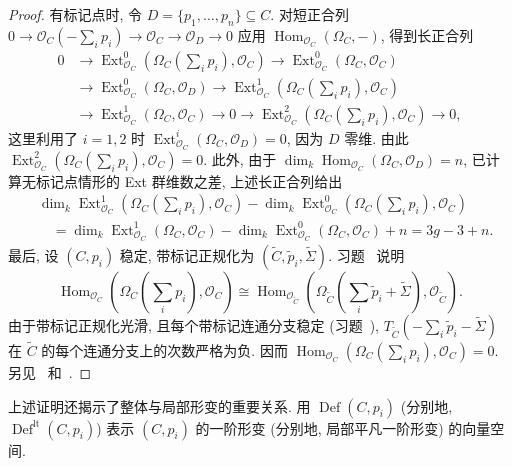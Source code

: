 \begin{proof}
有标记点时, 令 $D=\{p_1,\allowbreak \ldots,\allowbreak p_n\}\subseteq C$. 对短正合列 $0\to\mathcal O_C(-\sum_i p_i)\to\mathcal O_C\to\mathcal O_D\to0$ 应用 $\operatorname{Hom}_{\mathcal O_C}(\Omega_C,\allowbreak -)$, 得到长正合列
\[
\begin{aligned}
0&\to\operatorname{Ext}^0_{\mathcal O_C}(\Omega_C(\sum_i p_i),\mathcal O_C)\to\operatorname{Ext}^0_{\mathcal O_C}(\Omega_C,\mathcal O_C)\\
&\to\operatorname{Ext}^0_{\mathcal O_C}(\Omega_C,\mathcal O_D)\to\operatorname{Ext}^1_{\mathcal O_C}(\Omega_C(\sum_i p_i),\mathcal O_C)\\
&\to\operatorname{Ext}^1_{\mathcal O_C}(\Omega_C,\mathcal O_C)\to0\to\operatorname{Ext}^2_{\mathcal O_C}(\Omega_C(\sum_i p_i),\mathcal O_C)\to0,
\end{aligned}
\]
这里利用了 $i=1,\allowbreak 2$ 时 $\operatorname{Ext}^i_{\mathcal O_C}(\Omega_C,\allowbreak \mathcal O_D)=0$, 因为 $D$ 零维. 由此 $\operatorname{Ext}^2_{\mathcal O_C}(\Omega_C(\sum_i p_i),\allowbreak \mathcal O_C)=0$. 此外, 由于 $\dim_k\operatorname{Hom}_{\mathcal O_C}(\Omega_C,\allowbreak \mathcal O_D)=n$, 已计算无标记点情形的 Ext 群维数之差, 上述长正合列给出
\[
\begin{aligned}
&\dim_k\operatorname{Ext}^1_{\mathcal O_C}(\Omega_C(\sum_i p_i),\mathcal O_C)-\dim_k\operatorname{Ext}^0_{\mathcal O_C}(\Omega_C(\sum_i p_i),\mathcal O_C)\\
&\quad=\dim_k\operatorname{Ext}^1_{\mathcal O_C}(\Omega_C,\mathcal O_C)-\dim_k\operatorname{Ext}^0_{\mathcal O_C}(\Omega_C,\mathcal O_C)+n=3g-3+n.
\end{aligned}
\]
最后, 设 $(C,\allowbreak p_i)$ 稳定, 带标记正规化为 $(\widetilde C,\allowbreak \widetilde p_i,\allowbreak \widetilde\Sigma)$. 习题~ 说明
\[
\operatorname{Hom}_{\mathcal O_C}(\Omega_C(\sum_i p_i),\mathcal O_C)\cong\operatorname{Hom}_{\mathcal O_{\widetilde C}}(\Omega_{\widetilde C}(\sum_i\widetilde p_i+\widetilde\Sigma),\mathcal O_{\widetilde C}).
\]
由于带标记正规化光滑, 且每个带标记连通分支稳定 (习题~), $T_{\widetilde C}(-\sum_i\widetilde p_i-\widetilde\Sigma)$ 在 $\widetilde C$ 的每个连通分支上的次数严格为负. 因而 $\operatorname{Hom}_{\mathcal O_C}(\Omega_C(\sum_i p_i),\allowbreak \mathcal O_C)=0$. 另见~\cite[命题 1.5]{DM69} 和~\cite[\S 11.3]{ACG11}.
\end{proof}
上述证明还揭示了整体与局部形变的重要关系. 用 $\operatorname{Def}(C,\allowbreak p_i)$ (分别地, $\operatorname{Def}^{\mathrm{lt}}(C,\allowbreak p_i)$) 表示 $(C,\allowbreak p_i)$ 的一阶形变 (分别地, 局部平凡一阶形变) 的向量空间.

